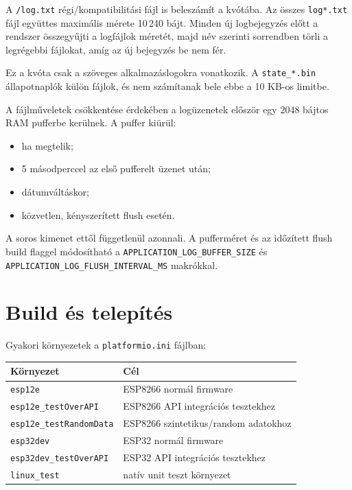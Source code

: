 \documentclass[11pt,a4paper]{article}
\begin{document}
A \texttt{/log.txt} régi/kompatibilitási fájl is beleszámít a kvótába. Az összes \texttt{log*.txt} fájl együttes maximális mérete 10\,240 bájt. Minden új logbejegyzés előtt a rendszer összegyűjti a logfájlok méretét, majd név szerinti sorrendben törli a legrégebbi fájlokat, amíg az új bejegyzés be nem fér.

Ez a kvóta csak a szöveges alkalmazáslogokra vonatkozik. A \texttt{state\_*.bin} állapotnaplók külön fájlok, és nem számítanak bele ebbe a 10 KB-os limitbe.

A fájlműveletek csökkentése érdekében a logüzenetek először egy 2048 bájtos RAM pufferbe kerülnek. A puffer kiürül:

\begin{itemize}
  \item ha megtelik;
  \item 5 másodperccel az első pufferelt üzenet után;
  \item dátumváltáskor;
  \item közvetlen, kényszerített flush esetén.
\end{itemize}

A soros kimenet ettől függetlenül azonnali. A pufferméret és az időzített flush build flaggel módosítható a \texttt{APPLICATION\_LOG\_BUFFER\_SIZE} és \texttt{APPLICATION\_LOG\_FLUSH\_INTERVAL\_MS} makrókkal.

\section{Build és telepítés}

Gyakori környezetek a \texttt{platformio.ini} fájlban:

\begin{longtable}{p{}p{}}
\toprule
Környezet & Cél \\
\midrule
\texttt{esp12e} & ESP8266 normál firmware \\
\texttt{esp12e\_testOverAPI} & ESP8266 API integrációs tesztekhez \\
\texttt{esp12e\_testRandomData} & ESP8266 szintetikus/random adatokhoz \\
\texttt{esp32dev} & ESP32 normál firmware \\
\texttt{esp32dev\_testOverAPI} & ESP32 API integrációs tesztekhez \\
\texttt{linux\_test} & natív unit teszt környezet \\
\bottomrule
\end{longtable}
\end{document}
